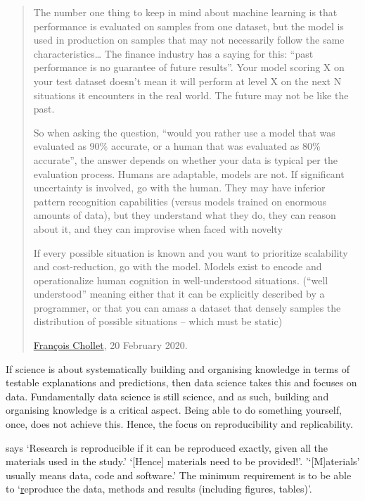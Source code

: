 \documentclass[
]{book}
\begin{document}
\begin{quote}
The number one thing to keep in mind about machine learning is that performance is evaluated on samples from one dataset, but the model is used in production on samples that may not necessarily follow the same characteristics\ldots{} The finance industry has a saying for this: ``past performance is no guarantee of future results''. Your model scoring X on your test dataset doesn't mean it will perform at level X on the next N situations it encounters in the real world. The future may not be like the past.

So when asking the question, ``would you rather use a model that was evaluated as 90\% accurate, or a human that was evaluated as 80\% accurate'', the answer depends on whether your data is typical per the evaluation process. Humans are adaptable, models are not. If significant uncertainty is involved, go with the human. They may have inferior pattern recognition capabilities (versus models trained on enormous amounts of data), but they understand what they do, they can reason about it, and they can improvise when faced with novelty

If every possible situation is known and you want to prioritize scalability and cost-reduction, go with the model. Models exist to encode and operationalize human cognition in well-understood situations. (``well understood'' meaning either that it can be explicitly described by a programmer, or that you can amass a dataset that densely samples the distribution of possible situations -- which must be static)

\href{https://twitter.com/fchollet/status/1230611916701229064?s=21}{François Chollet}, 20 February 2020.
\end{quote}

If science is about systematically building and organising knowledge in terms of testable explanations and predictions, then data science takes this and focuses on data. Fundamentally data science is still science, and as such, building and organising knowledge is a critical aspect. Being able to do something yourself, once, does not achieve this. Hence, the focus on reproducibility and replicability.

\citet{Alexander2019} says `Research is reproducible if it can be reproduced exactly, given all the materials used in the study.' `{[}Hence{]} materials need to be provided!'. '`{[}M{]}aterials' usually means data, code and software.' The minimum requirement is to be able to `\protect\hyperlink{r}{r}eproduce the data, methods and results (including figures, tables)'.
\end{document}
